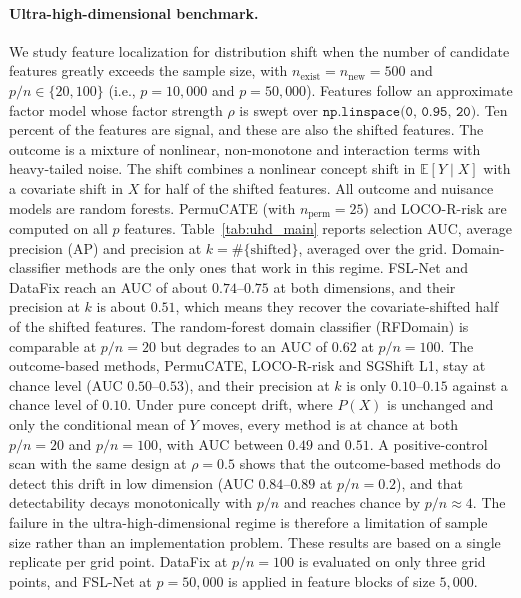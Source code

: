 
\paragraph{Ultra-high-dimensional benchmark.}
We study feature localization for distribution shift when the number of candidate features greatly exceeds the sample size, with $n_{\text{exist}} = n_{\text{new}} = 500$ and $p/n \in \{20, 100\}$ (i.e., $p = 10{,}000$ and $p = 50{,}000$). Features follow an approximate factor model whose factor strength $\rho$ is swept over $\texttt{np.linspace(0, 0.95, 20)}$. Ten percent of the features are signal, and these are also the shifted features. The outcome is a mixture of nonlinear, non-monotone and interaction terms with heavy-tailed noise. The shift combines a nonlinear concept shift in $\mathbb{E}[Y\mid X]$ with a covariate shift in $X$ for half of the shifted features. All outcome and nuisance models are random forests. PermuCATE (with $n_{\text{perm}}=25$) and LOCO-R-risk are computed on all $p$ features. Table~\ref{tab:uhd_main} reports selection AUC, average precision (AP) and precision at $k = \#\{\text{shifted}\}$, averaged over the grid. Domain-classifier methods are the only ones that work in this regime. FSL-Net and DataFix reach an AUC of about $0.74$--$0.75$ at both dimensions, and their precision at $k$ is about $0.51$, which means they recover the covariate-shifted half of the shifted features. The random-forest domain classifier (RFDomain) is comparable at $p/n = 20$ but degrades to an AUC of $0.62$ at $p/n = 100$. The outcome-based methods, PermuCATE, LOCO-R-risk and SGShift L1, stay at chance level (AUC $0.50$--$0.53$), and their precision at $k$ is only $0.10$--$0.15$ against a chance level of $0.10$. Under pure concept drift, where $P(X)$ is unchanged and only the conditional mean of $Y$ moves, every method is at chance at both $p/n = 20$ and $p/n = 100$, with AUC between $0.49$ and $0.51$. A positive-control scan with the same design at $\rho = 0.5$ shows that the outcome-based methods do detect this drift in low dimension (AUC $0.84$--$0.89$ at $p/n = 0.2$), and that detectability decays monotonically with $p/n$ and reaches chance by $p/n \approx 4$. The failure in the ultra-high-dimensional regime is therefore a limitation of sample size rather than an implementation problem. These results are based on a single replicate per grid point. DataFix at $p/n = 100$ is evaluated on only three grid points, and FSL-Net at $p = 50{,}000$ is applied in feature blocks of size $5{,}000$.

